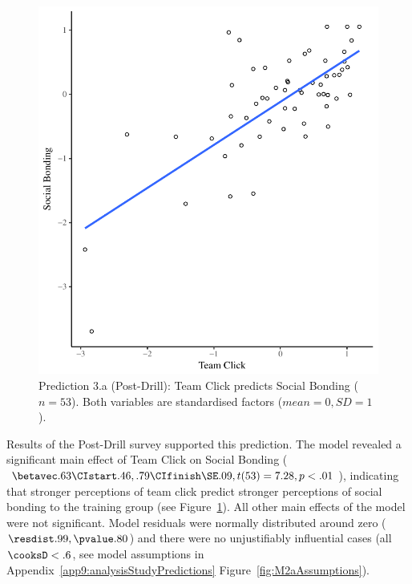\begin{CJK}{UTF8}{gbsn}


\begin{figure}
  \centering
    \includegraphics[width=0.5\linewidth,keepaspectratio] {images/groupClickBondScatter}
    \caption{Prediction 3.a (Post-Drill): Team Click predicts Social Bonding ($n = 53$).  Both variables are standardised factors ($mean = 0, SD = 1$).}
    \label{fig:groupClickBondScatter}
\end{figure}


Results of the Post-Drill survey supported this prediction. The model revealed a significant main effect of Team Click on Social Bonding ($\betavec .63 \CIstart .46, .79 \CIfinish \SE .09, t(53) = 7.28, p < .01$), indicating that stronger perceptions of team click predict stronger perceptions of social bonding to the training group (see Figure~\ref{fig:groupClickBondScatter}).  All other main effects of the model were not significant.  Model residuals were normally distributed around zero ($\resdist .99, \pvalue .80$) and there were no unjustifiably influential cases (all $\cooksD < .6$, see model assumptions in Appendix~\ref{app9:analysisStudyPredictions} Figure~\ref{fig:M2aAssumptions}).










\end{CJK}
